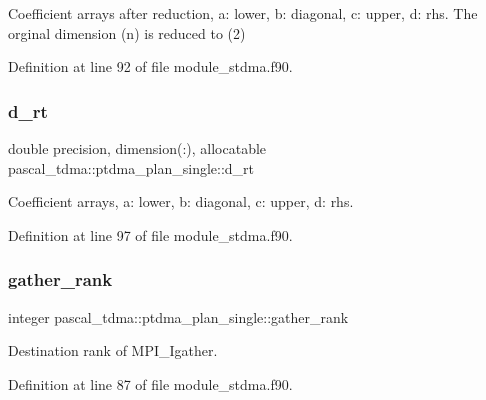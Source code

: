 Coefficient arrays after reduction, a\+: lower, b\+: diagonal, c\+: upper, d\+: rhs. The orginal dimension (n) is reduced to (2) 



Definition at line 92 of file module\+\_\+stdma.\+f90.

\mbox{\label{structpascal__tdma_1_1ptdma__plan__single_a627be8624cd48aa5b3aad7f6cf8d0b08}} 
\subsubsection{\texorpdfstring{d\_rt}{d\_rt}}
{\footnotesize\ttfamily double precision, dimension(\+:), allocatable pascal\+\_\+tdma\+::ptdma\+\_\+plan\+\_\+single\+::d\+\_\+rt}



Coefficient arrays, a\+: lower, b\+: diagonal, c\+: upper, d\+: rhs. 



Definition at line 97 of file module\+\_\+stdma.\+f90.

\mbox{\label{structpascal__tdma_1_1ptdma__plan__single_af0d3b3bce8b9956aa9e80ba0712a9a9d}} 
\subsubsection{\texorpdfstring{gather\_rank}{gather\_rank}}
{\footnotesize\ttfamily integer pascal\+\_\+tdma\+::ptdma\+\_\+plan\+\_\+single\+::gather\+\_\+rank}



Destination rank of M\+P\+I\+\_\+\+Igather. 



Definition at line 87 of file module\+\_\+stdma.\+f90.

\mbox{\label{structpascal__tdma_1_1ptdma__plan__single_af473533b36508af4e0752cee8d182334}} 
